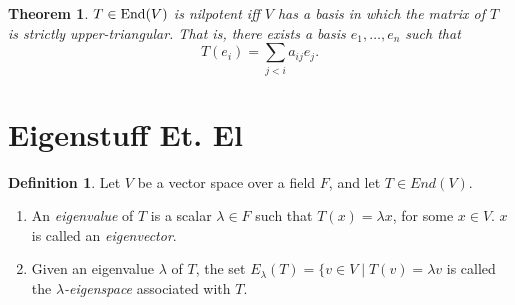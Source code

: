 \documentclass[12pt]{article}
\theoremstyle{definition}
\newtheorem{definition}{Definition}[section]
\theoremstyle{plain}
\newtheorem{theorem}{Theorem}[section]
\numberwithin{equation}{section}
\theoremstyle{definition}
\begin{document}
\begin{theorem}
$ T \in \operatorname{End}(V) $ is nilpotent iff $ V $ has a basis in which the matrix of $ T $ is strictly upper-triangular. That is, there exists a basis $ e_1, \ldots, e_n $ such that
\[ T(e_i) = \sum _{j < i} a_{ij}e_j. \]
\end{theorem}

\section{Eigenstuff Et. El}

\begin{definition}
Let $ V $ be a vector space over a field $ F $, and let $ T \in End(V) $.
\begin{enumerate}
\item An \textit{eigenvalue} of $ T $ is a scalar $ \lambda \in F $ such that $ T(x) = \lambda x $, for some $ x \in V$. $ x $ is called an \textit{eigenvector}.
\item Given an eigenvalue $ \lambda $ of $ T $, the set $ E_\lambda(T) = \{ v \in V \mid T(v) = \lambda v$ is called the \textit{$ \lambda $-eigenspace} associated with $ T $.
\end{enumerate}
\end{definition}
\end{document}
